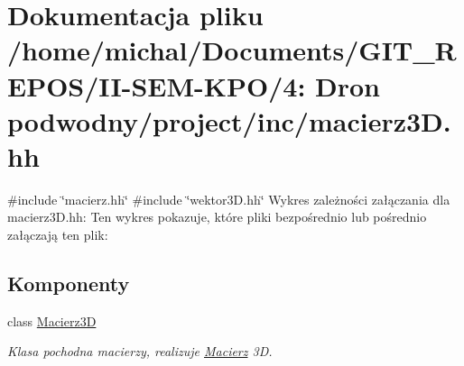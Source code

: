 \hypertarget{macierz3_d_8hh}{}\section{Dokumentacja pliku /home/michal/\+Documents/\+G\+I\+T\+\_\+\+R\+E\+P\+O\+S/\+I\+I-\/\+S\+E\+M-\/\+K\+P\+O/4\+: Dron podwodny/project/inc/macierz3D.hh}
\label{macierz3_d_8hh}
{\ttfamily \#include \char`\"{}macierz.\+hh\char`\"{}}\newline
{\ttfamily \#include \char`\"{}wektor3\+D.\+hh\char`\"{}}\newline
Wykres zależności załączania dla macierz3\+D.\+hh\+:
Ten wykres pokazuje, które pliki bezpośrednio lub pośrednio załączają ten plik\+:
\subsection*{Komponenty}
\begin{DoxyCompactItemize}
\item 
class \hyperlink{class_macierz3_d}{Macierz3D}
\begin{DoxyCompactList}\small\item\em Klasa pochodna macierzy, realizuje \hyperlink{class_macierz}{Macierz} 3D. \end{DoxyCompactList}\end{DoxyCompactItemize}
